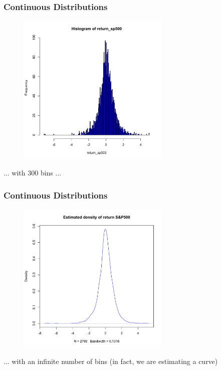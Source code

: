 \documentclass[notes=show,smaller,handout]{beamer}
\begin{document}
\begin{frame}%

\frametitle{Continuous Distributions}

\begin{example}[cont'd]
\begin{figure}[ptb]\centering
\includegraphics[width=0.65\textwidth,height=0.55\textheight]{sp_hist2.pdf}
\end{figure}
... with 300 bins ...
\end{example}
\end{frame}

\begin{frame}
\frametitle{Continuous Distributions}

\begin{example}[cont'd]
\begin{figure}[ptb]\centering
\includegraphics[width=0.65\textwidth,height=0.55\textheight]{R3_ks.pdf}
\end{figure}
... with an infinite number of bins (in fact, we are estimating a curve) 
\end{example}
\end{frame}
\end{document}
